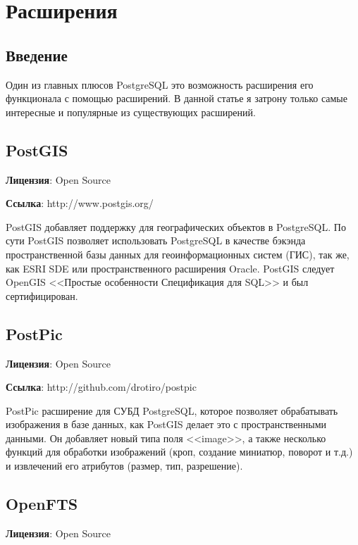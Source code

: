 \chapter{Расширения}
\begin{epigraphs}
\end{epigraphs}

\section{Введение}
Один из главных плюсов PostgreSQL это возможность расширения его функционала с помощью расширений. 
В данной статье я затрону только самые интересные и популярные из существующих расширений. 

\section{PostGIS}
\textbf{Лицензия}: Open Source

\textbf{Ссылка}: http://www.postgis.org/

PostGIS добавляет поддержку для географических объектов в PostgreSQL. По сути PostGIS позволяет использовать PostgreSQL в качестве 
бэкэнда пространственной базы данных для геоинформационных систем (ГИС), так же, как ESRI SDE или пространственного расширения Oracle. 
PostGIS следует OpenGIS <<Простые особенности Спецификация для SQL>> и был сертифицирован.




\section{PostPic}
\textbf{Лицензия}: Open Source

\textbf{Ссылка}: http://github.com/drotiro/postpic

PostPic расширение для СУБД PostgreSQL, которое позволяет обрабатывать изображения в базе данных, как PostGIS делает это с пространственными данными.
Он добавляет новый типа поля <<image>>, а также несколько функций для обработки изображений (кроп, создание миниатюр, поворот и т.д.) и 
извлечений его атрибутов (размер, тип, разрешение).

\section{OpenFTS}
\textbf{Лицензия}: Open Source


